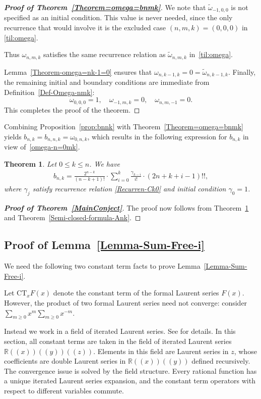 \documentclass[reqno, 12pt]{article}
\newtheorem{thm}{Theorem}[section]
\theoremstyle{mydefinition}
\theoremstyle{myremark}
\numberwithin{algorithm}{section}
\begin{document}
\begin{proof}[{\bf Proof of Theorem~\ref{Theorem=omega=bnmk}}]
We note that $\tilde{\omega}_{-1,0,0}$ is not specified as an initial condition. This value is never needed, since the only recurrence that would involve it is the excluded case $(n,m,k)=(0,0,0)$ in \eqref{til:omega}.

Thus $\omega_{n,m,k}$ satisfies the same recurrence relation as $\tilde{\omega}_{n,m,k}$ in~\eqref{til:omega}.

Lemma~\ref{Theorem-omega=nk-1=0} ensures that $\omega_{n,k-1,k}=0=\tilde{\omega}_{n,k-1,k}$. Finally, the remaining initial and boundary conditions are immediate from Definition~\ref{Def-Omega-nmk}:
$$
\omega_{0,0,0}=1,\quad \omega_{-1,m,k}=0,\quad \omega_{n,m,-1}=0.
$$
This completes the proof of the theorem.
\end{proof} 

Combining Proposition~\ref{prop:bnnk} with Theorem~\ref{Theorem=omega=bnmk} yields $b_{n,k}=b_{n,n,k}=\omega_{0,n,k}$, which results in the following expression for $b_{n,k}$ in view of~\eqref{omega-n=0mk}.

\begin{thm}\label{Conjecture-Bnk--semi-closed}
Let $0\leq k\leq n$. We have
\begin{align*}
b_{n,k}=\frac{2^{n-k}}{(n-k+1)!}\cdot\sum_{i=0}^k \frac{\gamma_{k-i}}{i!}\cdot (2n+k+i-1)!!,
\end{align*}
where $\gamma_{j}$ satisfy recurrence relation \eqref{Recurren-Ck0} and initial condition $\gamma_{0}=1$.
\end{thm}


\begin{proof}[{\bf Proof of Theorem~\ref{MainConject}}]
The proof now follows from Theorem~\ref{Conjecture-Bnk--semi-closed} and Theorem~\ref{Semi-closed-formula-Ank}.
\end{proof}


\subsection{Proof of Lemma~\ref{Lemma-Sum-Free-i}}\label{Proof-CT-Lemma}
We need the following two constant term facts to prove Lemma~\ref{Lemma-Sum-Free-i}.

Let $\mathrm{CT}_x F(x)$ denote the constant term of the formal Laurent series $F(x)$. However, the product of two formal Laurent series
need not converge: consider $\sum_{m\ge 0} x^m \sum_{m\ge 0} x^{-m}$.

Instead we work in a field of iterated Laurent series. See \cite{Xin04,Xin15} for details.
In this section, all constant terms are taken in the field of iterated Laurent series
$\mathbb{R}((x))((y))((z))$. Elements in this field are Laurent series in $z$, whose coefficients are double Laurent series in $\mathbb{R}((x))((y))$
defined recursively.
The convergence issue is solved by the field structure.
Every rational function has a unique iterated Laurent series expansion, and the constant term operators with respect to different variables commute.
\end{document}
